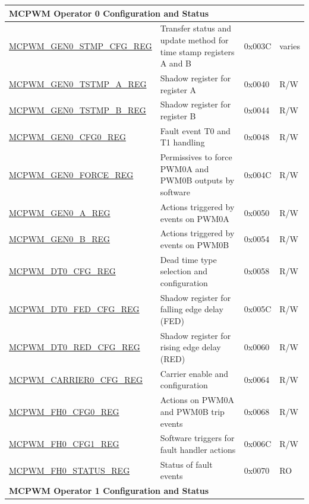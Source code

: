 \begin{longtable}{ | p{6cm} | p{7.2cm} | p{1.3cm} | p{1cm} | }
\multicolumn{4}{|l|}{\textbf{MCPWM Operator 0 Configuration and Status}} \\ \hline
\hyperref[regdesc:MCPWMGEN0STMPCFGREG]{MCPWM\_GEN0\_STMP\_CFG\_REG} & Transfer status and update method for time stamp registers A and B & 0x003C & varies \\ \hline
\hyperref[regdesc:MCPWMGEN0TSTMPAREG]{MCPWM\_GEN0\_TSTMP\_A\_REG} & Shadow register for register A & 0x0040 & R/W \\ \hline
\hyperref[regdesc:MCPWMGEN0TSTMPBREG]{MCPWM\_GEN0\_TSTMP\_B\_REG} & Shadow register for register B & 0x0044 & R/W \\ \hline
\hyperref[regdesc:MCPWMGEN0CFG0REG]{MCPWM\_GEN0\_CFG0\_REG} & Fault event T0 and T1 handling & 0x0048 & R/W \\ \hline
\hyperref[regdesc:MCPWMGEN0FORCEREG]{MCPWM\_GEN0\_FORCE\_REG} & Permissives to force PWM0A and PWM0B outputs by software & 0x004C & R/W \\ \hline
\hyperref[regdesc:MCPWMGEN0AREG]{MCPWM\_GEN0\_A\_REG} & Actions triggered by events on PWM0A & 0x0050 & R/W \\ \hline
\hyperref[regdesc:MCPWMGEN0BREG]{MCPWM\_GEN0\_B\_REG} & Actions triggered by events on PWM0B & 0x0054 & R/W \\ \hline
\hyperref[regdesc:MCPWMDT0CFGREG]{MCPWM\_DT0\_CFG\_REG} & Dead time type selection and configuration & 0x0058 & R/W \\ \hline
\hyperref[regdesc:MCPWMDT0FEDCFGREG]{MCPWM\_DT0\_FED\_CFG\_REG} & Shadow register for falling edge delay (FED) & 0x005C & R/W \\ \hline
\hyperref[regdesc:MCPWMDT0REDCFGREG]{MCPWM\_DT0\_RED\_CFG\_REG} & Shadow register for rising edge delay (RED) & 0x0060 & R/W \\ \hline
\hyperref[regdesc:MCPWMCARRIER0CFGREG]{MCPWM\_CARRIER0\_CFG\_REG} & Carrier enable and configuration & 0x0064 & R/W \\ \hline
\hyperref[regdesc:MCPWMFH0CFG0REG]{MCPWM\_FH0\_CFG0\_REG} & Actions on PWM0A and PWM0B trip events & 0x0068 & R/W \\ \hline
\hyperref[regdesc:MCPWMFH0CFG1REG]{MCPWM\_FH0\_CFG1\_REG} & Software triggers for fault handler actions & 0x006C & R/W \\ \hline
\hyperref[regdesc:MCPWMFH0STATUSREG]{MCPWM\_FH0\_STATUS\_REG} & Status of fault events & 0x0070 & RO \\ \hline
\multicolumn{4}{|l|}{\textbf{MCPWM Operator 1 Configuration and Status}} \\ \hline

\end{longtable}
